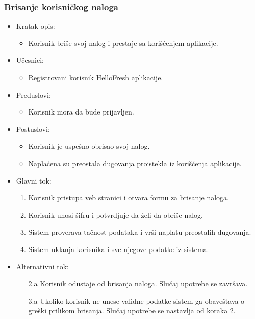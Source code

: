\subsubsection{Brisanje korisničkog naloga}

\begin{itemize}
    \item Kratak opis:
        \begin{itemize}
            \item Korisnik briše svoj nalog i prestaje sa korišćenjem aplikacije.
        \end{itemize}
    \item Učesnici:
        \begin{itemize}
            \item Registrovani korisnik HelloFresh aplikacije.
        \end{itemize}
    \item Preduslovi:
        \begin{itemize}
            \item Korisnik mora da bude prijavljen.
        \end{itemize}
    \item Postuslovi:
        \begin{itemize}
            \item Korisnik je uspešno obrisao svoj nalog.
            \item Naplaćena su preostala dugovanja proistekla iz korišćenja aplikacije.
        \end{itemize}
    \item Glavni tok:
        \begin{enumerate}
            \item Korisnik pristupa veb stranici i otvara formu za brisanje naloga.
            \item Korisnik unosi šifru i potvrdjuje da želi da obriše nalog.
            \item Sistem proverava tačnost podataka i vrši naplatu preostalih dugovanja.
            \item Sistem uklanja korisnika i sve njegove podatke iz sistema.
        \end{enumerate}
    \item Alternativni tok:
        \begin{itemize}
            \item[2.a] Korisnik odustaje od brisanja naloga. Slučaj upotrebe se završava.
			\item[3.a] Ukoliko korisnik ne unese validne podatke sistem ga obaveštava o greški prilikom brisanja. Slučaj upotrebe se nastavlja od koraka 2.
        \end{itemize}
\end{itemize}

